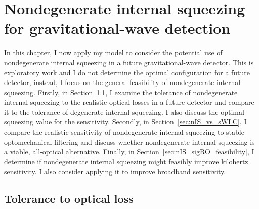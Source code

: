 \chapter{Nondegenerate internal squeezing for gravitational-wave detection}
\label{chp:science_case}


In this chapter, I now apply my model to consider the potential use of nondegenerate internal squeezing in a future gravitational-wave detector. This is exploratory work and I do not determine the optimal configuration for a future detector, instead, I focus on the general feasibility of nondegenerate internal squeezing. %
Firstly, in Section~\ref{sec:nIS_tolerance_to_losses}, I examine the tolerance of nondegenerate internal squeezing to the realistic optical losses in a future detector and compare it to the tolerance of degenerate internal squeezing. I also discuss the optimal squeezing value for the sensitivity. Secondly, in Section~\ref{sec:nIS_vs_sWLC}, I compare the realistic sensitivity of nondegenerate internal squeezing to stable optomechanical filtering and discuss whether nondegenerate internal squeezing is a viable, all-optical alternative. Finally, in Section~\ref{sec:nIS_sigRO_feasibility}, I determine if nondegenerate internal squeezing might feasibly improve kilohertz sensitivity. I also consider applying it to improve broadband sensitivity. %

\section{Tolerance to optical loss}
\label{sec:nIS_tolerance_to_losses}

